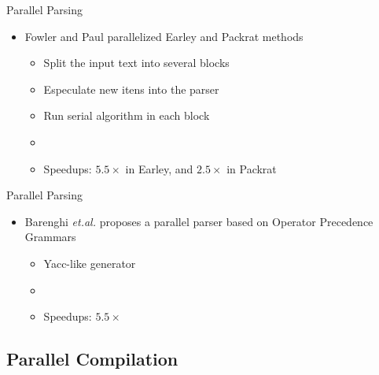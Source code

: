 
\begin{frame}{Parallel Parsing}
\begin{itemize}
    \item Fowler and Paul \cite{fowler2009parallel} parallelized Earley and Packrat methods 
    \begin{itemize}
        \item Split the input text into several blocks
        \item Especulate new itens into the parser
        \item Run serial algorithm in each block
        \item[]
        \item Speedups: $5.5\times$ in Earley, and $2.5\times$ in Packrat
    \end{itemize}
\end{itemize}
\end{frame}


\begin{frame}{Parallel Parsing}
\begin{itemize}
    \item Barenghi \textit{et.al.} \cite{Barenghi:2015:PPM:2839536.2840146} proposes a parallel parser based on Operator Precedence Grammars
    \begin{itemize}
        \item Yacc-like generator
        \item[]
        \item Speedups: $5.5\times$
    \end{itemize}
\end{itemize}
\end{frame}

\subsection{Parallel Compilation}

